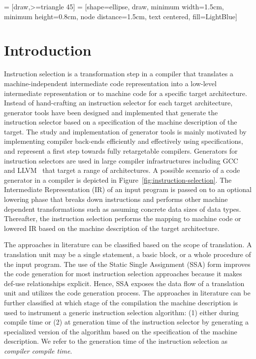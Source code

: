  = [draw,>=triangle 45]
 = [shape=ellipse, draw, minimum width=1.5cm,
                     minimum height=0.8cm, node distance=1.5cm,
                     text centered, fill=LightBlue]
\section{Introduction}

Instruction selection is a transformation step in a compiler that
translates a machine-independent intermediate code representation into
a low-level intermediate representation or to machine code for a
specific target architecture. Instead of hand-crafting an instruction
selector for each target architecture, generator tools have been
designed and implemented that generate the instruction selector based
on a specification of the machine description of the target. The study
and implementation of generator tools is mainly motivated by
implementing compiler back-ends efficiently and effectively using
specifications, and represent a first step towards fully retargetable
compilers. Generators for instruction
selectors are used in large compiler infrastructures including
GCC~\cite{wwwGCC} and LLVM~\cite{wwwLLVM} that target a range of
architectures.
A possible scenario of a code generator in a compiler is depicted in
Figure~\ref{fig:instruction-selection}. The Intermediate
Representation (IR) of an input program is passed on to an optional lowering phase that
breaks down instructions and performs other machine dependent
transformations such as assuming concrete data sizes of data
types. Thereafter, the instruction selection performs the mapping to machine code or
lowered IR based on the machine description of
the target architecture.

The approaches in literature can be classified based on the scope of
translation. A translation unit may be a single statement, a basic
block, or a whole procedure of the input program. The use of the
Static Single Assignment (SSA) form improves the code generation for
most instruction selection approaches because it makes def-use
relationships explicit. Hence, SSA exposes the data flow of a
translation unit and utilizes the code generation process.  The
approaches in literature can be further classified at which stage of
the compilation the machine description is used to instrument a
generic instruction selection algorithm: (1) either during compile
time or (2) at generation time of the instruction selector by
generating a specialized version of the algorithm based on the
specification of the machine description. We refer to the generation
time of the instruction selection as \emph{compiler compile time}.

